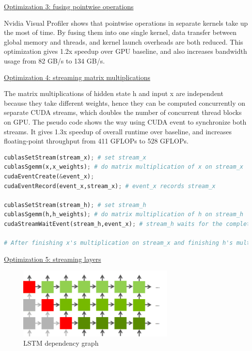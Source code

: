 \documentclass{article}
\begin{document}
\underline{\large{Optimization 3: fusing pointwise operations}}

Nvidia Visual Profiler shows that pointwise operations in separate kernels take up the most of time. By fusing them into one single kernel, data transfer between global memory and threads, and kernel launch overheads are both reduced. This optimization gives 1.2x speedup over GPU baseline, and also increases bandwidth usage from 82 GB/s to 134 GB/s.

\underline{\large{Optimization 4: streaming matrix multiplications}}

The matrix multiplications of hidden state h and input x are independent because they take different weights, hence they can be computed concurrently on separate CUDA streams, which doubles the number of concurrent thread blocks on GPU. The pseudo code shows the way using CUDA event to synchronize both streams. It gives 1.3x speedup of overall runtime over baseline, and increases floating-point throughput from 411 GFLOPs to 528 GFLOPs.

\begin{lstlisting}[language=Python, caption=Pseudo code of using event to synchronize two streams]
cublasSetStream(stream_x); # set stream_x
cublasSgemm(x,x_weights); # do matrix multiplication of x on stream_x
cudaEventCreate(&event_x);
cudaEventRecord(event_x,stream_x); # event_x records stream_x

cublasSetStream(stream_h); # set stream_h
cublasSgemm(h,h_weights); # do matrix multiplication of h on stream_h
cudaStreamWaitEvent(stream_h,event_x); # stream_h waits for the completion of event_x

# After finishing x's multiplication on stream_x and finishing h's multiplication on stream_h, do kernel on stream_h
\end{lstlisting}

\underline{\large{Optimization 5: streaming layers}}

\begin{figure}[H]
\centering
\includegraphics[width=0.7\textwidth]{layers}
\caption{LSTM dependency graph}
\label{dependency}
\end{figure}
\end{document}
